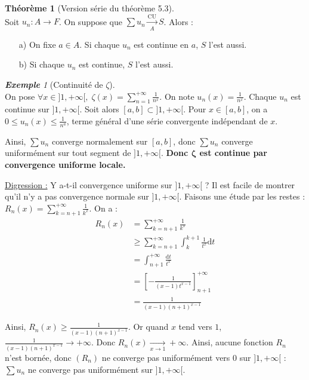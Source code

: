 \documentclass[12pt]{book}
\newcommand{\limite}[2]{\ensuremath{\underset{#1 \to #2}{\longrightarrow}}}
\newcommand{\lu}[1]{\ensuremath{\overset{\mathrm{CU}}{\underset{#1}{\longrightarrow}}}}
\theoremstyle{definition}
\newtheorem{thme}{Théorème}[chapter]
\theoremstyle{remark}
\newtheorem*{ex}{\textbf{Exemple}}
\newenvironment{fthme}
  {\begin{mdframed}[roundcorner=10pt, linewidth=2pt]\begin{thme}}
  {\end{thme}\end{mdframed}}
\begin{document}
	\begin{fthme}[Version série du théorème 5.3]\mbox{~}\\
	Soit $u_n : A \longrightarrow F$. On suppose que $\sum u_n \lu A S$. Alors :
	\begin{itemize}
	\item[a)] On fixe $a \in A$. Si chaque $u_n$ est continue en $a$, $S$ l'est aussi.
	\item[b)] Si chaque $u_n$ est continue, $S$ l'est aussi.
	\end{itemize}
	\end{fthme}
	
	\begin{ex}[Continuité de $\zeta$]\mbox{~}\\
	On pose $\forall x \in ]1, +\infty[,\; \zeta(x) = \sum_{n=1}^{+\infty} \frac{1}{n^x}$. On note $u_n(x) = \frac{1}{n^x}$. Chaque $u_n$ est continue sur $]1, +\infty[$. Soit alors $[a,b] \subset ]1, +\infty[$. Pour $x \in [a,b]$, on a $0 \leq u_n(x) \leq \frac{1}{n^a}$, terme général d'une série convergente indépendant de $x$.
	
	Ainsi, $\sum u_n$ converge normalement sur $[a,b]$, donc $\sum u_n$ converge uniformément sur tout segment de $]1, +\infty[$. \textbf{Donc $\bm{\zeta}$ est continue par convergence uniforme locale.}
	
	\underline{Digression :} Y a-t-il convergence uniforme sur $]1, +\infty[$ ? Il est facile de montrer qu'il n'y a pas convergence normale sur $]1, +\infty[$. Faisons une étude par les restes :
	$R_n(x) = \sum_{k=n+1}^{+\infty} \frac{1}{k^x}$. On a :
	\begin{align*}
	R_n(x) &= \sum_{k=n+1}^{+\infty} \frac{1}{k^x}\\
	&\geq \sum_{k=n+1}^{+\infty} \int_k^{k+1} \frac{1}{t^x}\mathrm dt \\
	&= \int_{n+1}^{+\infty} \frac{\mathrm dt}{t^x} \\
	&= \left[ - \frac{1}{(x-1)t^{x-1}}\right]_{n+1}^{+\infty} \\
	&= \frac{1}{(x-1)(n+1)^{x-1}}
	\end{align*}
	
	Ainsi, $R_n(x) \geq \frac{1}{(x-1)(n+1)^{x-1}}$. Or quand $x$ tend vers $1$, $\frac{1}{(x-1)(n+1)^{x-1}} \longrightarrow +\infty$. Donc $R_n(x) \limite{x}{1} +\infty$. Ainsi, aucune fonction $R_n$ n'est bornée, donc $(R_n)$ ne converge pas uniformément vers $0$ sur $]1, +\infty[$ : $\sum u_n$ ne converge pas uniformément sur $]1, +\infty[$.	
	\end{ex}
	
\end{document}
